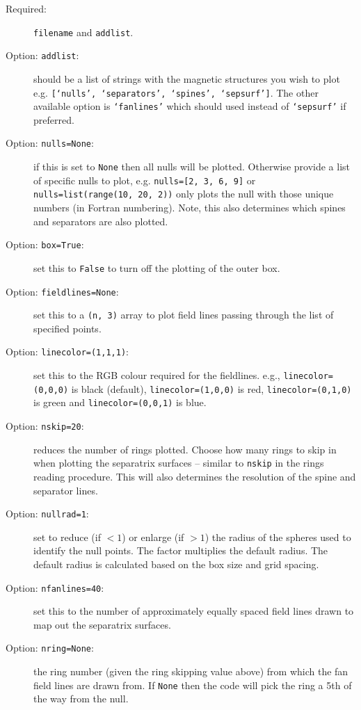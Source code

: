 \documentclass[12pt]{article}
\begin{document}
      \begin{description}
        \item [Required:] \texttt{filename} and \texttt{addlist}.
        \item [Option: \texttt{addlist}:] should be a list of strings with the magnetic structures you wish to plot e.g. \texttt{[`nulls', `separators', `spines', `sepsurf']}. The other available option is \texttt{`fanlines'} which should used instead of \texttt{`sepsurf'} if preferred.
        \item [Option: \texttt{nulls=None}:] if this is set to \texttt{None} then all nulls will be plotted. Otherwise provide a list of specific nulls to plot, e.g. \texttt{nulls=[2, 3, 6, 9]} or \texttt{nulls=list(range(10, 20, 2))} only plots the null with those unique numbers (in Fortran numbering). Note, this also determines which spines and separators are also plotted.
        \item [Option: \texttt{box=True}:] set this to \texttt{False} to turn off the plotting of the outer box.
        \item [Option: \texttt{fieldlines=None}:] set this to a \texttt{(n, 3)} array to plot field lines passing through the list of specified points.
        \item [Option: \texttt{linecolor=(1,1,1)}:] set this to the RGB colour required for the fieldlines. e.g., \texttt{linecolor=(0,0,0)} is black (default),  \texttt{linecolor=(1,0,0)} is red, \texttt{linecolor=(0,1,0)} is green and \texttt{linecolor=(0,0,1)} is blue.
        \item [Option: \texttt{nskip=20}:] reduces the number of rings plotted. Choose how many rings to skip in when plotting the separatrix surfaces -- similar to \texttt{nskip} in the rings reading procedure. This will also determines the resolution of the spine and separator lines.
        \item [Option: \texttt{nullrad=1}:] set to reduce (if $<1$) or enlarge (if $>1$) the radius of the spheres used to identify the null points. The factor multiplies the default radius. The default radius is calculated based on the box size and grid spacing.
        \item [Option: \texttt{nfanlines=40}:] set this to the number of approximately equally spaced field lines drawn to map out the separatrix surfaces.
        \item [Option: \texttt{nring=None}:] the ring number (given the ring skipping value above) from which the fan field lines are drawn from. If \texttt{None} then the code will pick the ring a 5th of the way from the null.
      \end{description}
\end{document}
